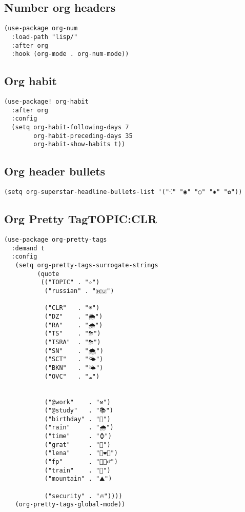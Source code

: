 \documentclass[11pt]{article}
\begin{document}
\subsection{Number org headers}
\label{sec:org8f38366}
\begin{verbatim}
(use-package org-num
  :load-path "lisp/"
  :after org
  :hook (org-mode . org-num-mode))
\end{verbatim}
\subsection{Org habit}
\label{sec:orgea4dd6d}

\begin{verbatim}
(use-package! org-habit
  :after org
  :config
  (setq org-habit-following-days 7
        org-habit-preceding-days 35
        org-habit-show-habits t))
\end{verbatim}
\subsection{Org header bullets}
\label{sec:org9a8616e}

\begin{verbatim}
(setq org-superstar-headline-bullets-list '("⁖" "◉" "○" "✸" "✿"))
\end{verbatim}
\subsection{Org Pretty Tag\hfill{}\textsc{TOPIC:CLR}}
\label{sec:org7bbe47c}

\begin{verbatim}
(use-package org-pretty-tags
  :demand t
  :config
   (setq org-pretty-tags-surrogate-strings
         (quote
          (("TOPIC" . "☆")
           ("russian" . "🇷🇺")

           ("CLR"   . "☀")
           ("DZ"    . "🌦")
           ("RA"    . "🌧")
           ("TS"    . "⛈")
           ("TSRA"  . "⛈")
           ("SN"    . "🌨")
           ("SCT"   . "🌤")
           ("BKN"   . "🌤")
           ("OVC"   . "☁")


           ("@work"    . "⚒")
           ("@study"   . "📚")
           ("birthday" . "🎂")
           ("rain"     . "🌧")
           ("time"     . "⌚")
           ("grat"     . "🤗")
           ("lena"     . "👩‍❤️‍👩")
           ("fp"       . "🤦🏻‍♂️")
           ("train"    . "🚆")
           ("mountain" . "⛰️")

           ("security" . "🔥"))))
   (org-pretty-tags-global-mode))
\end{verbatim}
\end{document}
